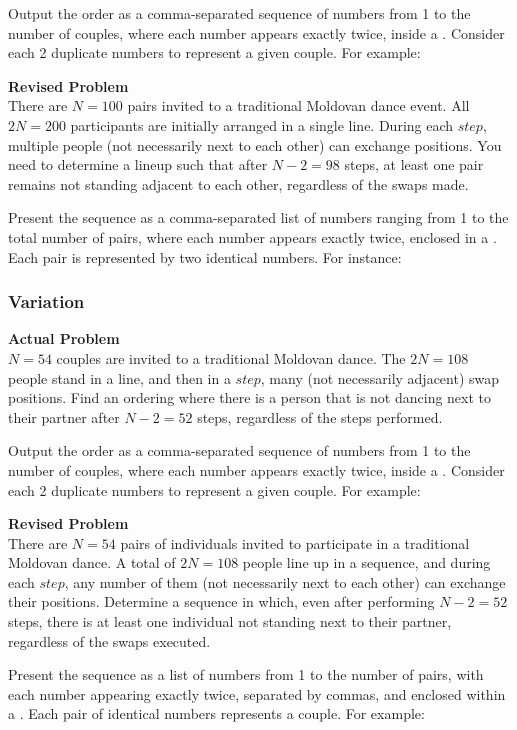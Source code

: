 Output the order as a comma-separated sequence of numbers from 1 to the number of couples, where each number appears exactly twice, inside a \boxed. Consider each 2 duplicate numbers to represent a given couple. For example: 

\textbf{Revised Problem}\\
There are $N = 100$ pairs invited to a traditional Moldovan dance event. All $2N = 200$ participants are initially arranged in a single line. During each $\textit{step}$, multiple people (not necessarily next to each other) can exchange positions. You need to determine a lineup such that after $N-2 = 98$ steps, at least one pair remains not standing adjacent to each other, regardless of the swaps made.

Present the sequence as a comma-separated list of numbers ranging from 1 to the total number of pairs, where each number appears exactly twice, enclosed in a \boxed. Each pair is represented by two identical numbers. For instance: 

\subsubsection{Variation}
\textbf{Actual Problem}\\
$N=54$ couples are invited to a traditional Moldovan dance. The $2N=108$ people stand in a line, and then in a $\textit{step}$, many (not necessarily adjacent) swap positions. Find an ordering where there is a person that is not dancing next to their partner after $N-2=52$ steps, regardless of the steps performed.

Output the order as a comma-separated sequence of numbers from 1 to the number of couples, where each number appears exactly twice, inside a \boxed. Consider each 2 duplicate numbers to represent a given couple. For example: 

\textbf{Revised Problem}\\
There are $N=54$ pairs of individuals invited to participate in a traditional Moldovan dance. A total of $2N=108$ people line up in a sequence, and during each $\textit{step}$, any number of them (not necessarily next to each other) can exchange their positions. Determine a sequence in which, even after performing $N-2=52$ steps, there is at least one individual not standing next to their partner, regardless of the swaps executed.

Present the sequence as a list of numbers from 1 to the number of pairs, with each number appearing exactly twice, separated by commas, and enclosed within a \boxed. Each pair of identical numbers represents a couple. For example: 


